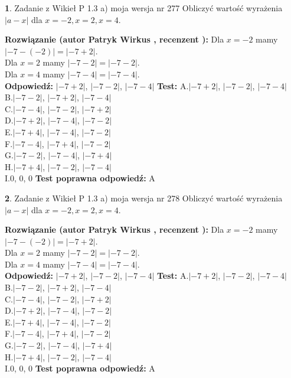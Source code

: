 \documentclass[12pt, a4paper]{article}
\theoremstyle{definition} %
\newtheorem{zad}{}
\newcommand{\zadStart}[1]{\begin{zad}#1\newline}
\newcommand{\zadStop}{\end{zad}}
\newcommand{\rozwStart}[2]{\noindent \textbf{Rozwiązanie (autor #1 , recenzent #2): }\newline}
\newcommand{\rozwStop}{\newline}
\newcommand{\odpStart}{\noindent \textbf{Odpowiedź:}\newline}
\newcommand{\odpStop}{\newline}
\newcommand{\testStart}{\noindent \textbf{Test:}\newline}
\newcommand{\testStop}{\newline}
\newcommand{\kluczStart}{\noindent \textbf{Test poprawna odpowiedź:}\newline}
\newcommand{\kluczStop}{\newline}
\begin{document}
\zadStart{Zadanie z Wikieł P 1.3 a) moja wersja nr 277}
Obliczyć wartość wyrażenia $|a - x|$ dla $x=-2,x=2,x=4$.
\zadStop
\rozwStart{Patryk Wirkus}{}
Dla $x = -2$ mamy $|-7 - (-2)| = |-7 + 2|$.\\
Dla $x = 2$ mamy $|-7 - 2| = |-7 - 2|$.\\
Dla $x = 4$ mamy $|-7 - 4| = |-7 - 4|$.\\
\rozwStop
\odpStart
$|-7 + 2|$, $|-7 - 2|$, $|-7 - 4|$
\odpStop
\testStart
A.$|-7 + 2|$, $|-7 - 2|$, $|-7 - 4|$\\
B.$|-7 - 2|$, $|-7 + 2|$, $|-7 - 4|$\\
C.$|-7 - 4|$, $|-7 - 2|$, $|-7 + 2|$\\
D.$|-7 + 2|$, $|-7 - 4|$, $|-7 - 2|$\\
E.$|-7 + 4|$, $|-7 - 4|$, $|-7 - 2|$\\
F.$|-7 - 4|$, $|-7 + 4|$, $|-7 - 2|$\\
G.$|-7 - 2|$, $|-7 - 4|$, $|-7 + 4|$\\
H.$|-7 + 4|$, $|-7 - 2|$, $|-7 - 4|$\\
I.$0$, $0$, $0$
\testStop
\kluczStart
A
\kluczStop



\zadStart{Zadanie z Wikieł P 1.3 a) moja wersja nr 278}
Obliczyć wartość wyrażenia $|a - x|$ dla $x=-2,x=2,x=4$.
\zadStop
\rozwStart{Patryk Wirkus}{}
Dla $x = -2$ mamy $|-7 - (-2)| = |-7 + 2|$.\\
Dla $x = 2$ mamy $|-7 - 2| = |-7 - 2|$.\\
Dla $x = 4$ mamy $|-7 - 4| = |-7 - 4|$.\\
\rozwStop
\odpStart
$|-7 + 2|$, $|-7 - 2|$, $|-7 - 4|$
\odpStop
\testStart
A.$|-7 + 2|$, $|-7 - 2|$, $|-7 - 4|$\\
B.$|-7 - 2|$, $|-7 + 2|$, $|-7 - 4|$\\
C.$|-7 - 4|$, $|-7 - 2|$, $|-7 + 2|$\\
D.$|-7 + 2|$, $|-7 - 4|$, $|-7 - 2|$\\
E.$|-7 + 4|$, $|-7 - 4|$, $|-7 - 2|$\\
F.$|-7 - 4|$, $|-7 + 4|$, $|-7 - 2|$\\
G.$|-7 - 2|$, $|-7 - 4|$, $|-7 + 4|$\\
H.$|-7 + 4|$, $|-7 - 2|$, $|-7 - 4|$\\
I.$0$, $0$, $0$
\testStop
\kluczStart
A
\kluczStop
\end{document}
